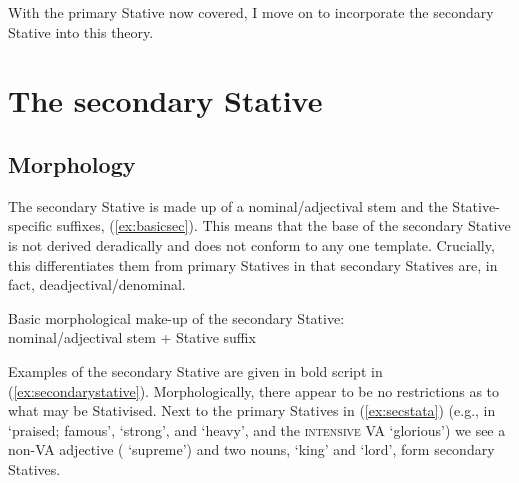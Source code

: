 \documentclass[output=paper,colorlinks,citecolor=brown]{langscibook}
\begin{document}
With the primary Stative  now covered, I move on to incorporate the secondary Stative into this theory.

\section{The secondary Stative}
\label{sec:secondarystative}

\subsection{Morphology}
\label{sec:secstatmorph}

The secondary Stative is made up of a nominal/adjectival stem and the Stative-specific suffixes, (\ref{ex:basicsec}). This means that the base of the secondary Stative is not derived deradically and does not conform to any one template. Crucially, this differentiates them from primary Statives in that secondary Statives are, in fact, deadjectival/denominal. 

\begin{exe} 
\ex Basic morphological make-up of the secondary Stative:\label{ex:basicsec} \\
nominal/adjectival stem + Stative suffix
\end{exe}

 Examples of the secondary Stative are given in bold script in (\ref{ex:secondarystative}). Morphologically, there appear to be no restrictions as to what may be Stativised. Next to the primary Statives  in (\ref{ex:secstata}) (e.g., in  `praised; famous',  `strong', and  `heavy', and the \textsc{intensive} VA  `glorious') we see a non-VA adjective ( `supreme') and two nouns,  `king' and  `lord', form secondary Statives.
\end{document}
